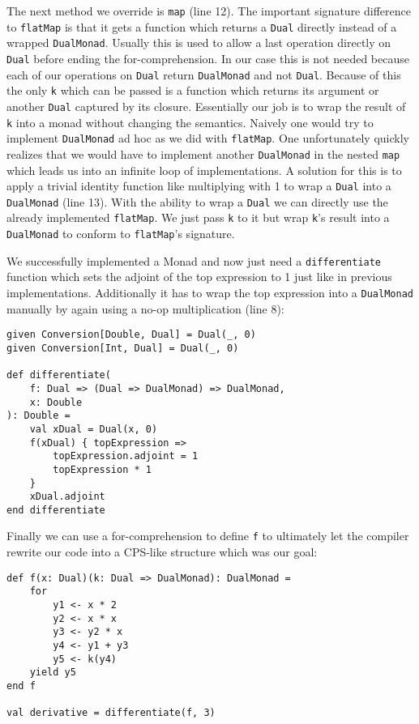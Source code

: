 The next method we override is \lstinline{map} (line 12). The important signature difference to \lstinline{flatMap} is that it gets a function which returns a \lstinline{Dual} directly instead of a wrapped \lstinline{DualMonad}. Usually this is used to allow a last operation directly on \lstinline{Dual} before ending the for-comprehension. In our case this is not needed because each of our operations on \lstinline{Dual} return \lstinline{DualMonad} and not \lstinline{Dual}. Because of this the only \lstinline{k} which can be passed is a function which returns its argument or another \lstinline{Dual} captured by its closure. Essentially our job is to wrap the result of \lstinline{k} into a monad without changing the semantics. Naively one would try to implement \lstinline{DualMonad} ad hoc as we did with \lstinline{flatMap}. One unfortunately quickly realizes that we would have to implement another \lstinline{DualMonad} in the nested \lstinline{map} which leads us into an infinite loop of implementations. A solution for this is to apply a trivial identity function like multiplying with 1 to wrap a \lstinline{Dual} into a \lstinline{DualMonad} (line 13). With the ability to wrap a \lstinline{Dual} we can directly use the already implemented \lstinline{flatMap}. We just pass \lstinline{k} to it but wrap \lstinline{k}'s result into a \lstinline{DualMonad} to conform to \lstinline{flatMap}'s signature.

We successfully implemented a Monad and now just need a \lstinline{differentiate} function which sets the adjoint of the top expression to 1 just like in previous implementations. Additionally it has to wrap the top expression into a \lstinline{DualMonad} manually by again using a no-op multiplication (line 8):
\begin{lstlisting}
given Conversion[Double, Dual] = Dual(_, 0)
given Conversion[Int, Dual] = Dual(_, 0)

def differentiate(
    f: Dual => (Dual => DualMonad) => DualMonad, 
    x: Double
): Double =
    val xDual = Dual(x, 0)
    f(xDual) { topExpression =>
        topExpression.adjoint = 1
        topExpression * 1
    }
    xDual.adjoint
end differentiate
\end{lstlisting}

Finally we can use a for-comprehension to define \lstinline{f} to ultimately let the compiler rewrite our code into a CPS-like structure which was our goal:
\begin{lstlisting}
def f(x: Dual)(k: Dual => DualMonad): DualMonad =
    for
        y1 <- x * 2
        y2 <- x * x
        y3 <- y2 * x
        y4 <- y1 + y3
        y5 <- k(y4)
    yield y5
end f

val derivative = differentiate(f, 3)
\end{lstlisting}


